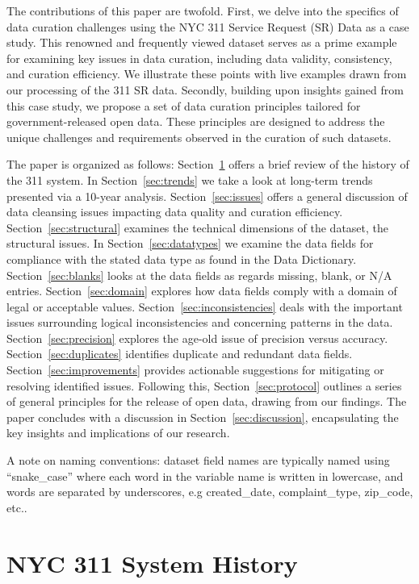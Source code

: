\documentclass[12pt, titlepage]{article}
\begin{document}
The contributions of this paper are twofold. First, we delve into
the specifics of data curation challenges using the NYC 311 Service
Request (SR) Data as a case study. This renowned and frequently viewed 
dataset serves as a prime example for examining key issues in data curation, 
including data validity, consistency, and curation efficiency. 
We illustrate these points with live examples drawn from our processing of the 311 SR data. 
Secondly, building upon insights gained from this case study, we 
propose a set of data curation principles tailored for government-released open data. 
These principles are designed to address the unique challenges 
and requirements observed in the curation of such datasets.


The paper is organized as follows:
Section~\ref{sec:history} offers a brief review of the history of the 311 system. In 
Section~\ref{sec:trends} we take a look at long-term trends presented via a 10-year analysis.
Section~\ref{sec:issues} offers a general discussion of data cleansing issues
impacting data quality and curation efficiency. Section~\ref{sec:structural} examines
the technical dimensions of the dataset, the structural issues. In Section~\ref{sec:datatypes} we examine the data fields
for compliance with the stated data type as found in the Data Dictionary. Section~\ref{sec:blanks} looks
at the data fields as regards missing, blank, or N/A entries. Section~\ref{sec:domain} explores
how data fields comply with a domain of legal or acceptable values. Section~\ref{sec:inconsistencies}
deals with the important issues surrounding logical inconsistencies and concerning patterns in the data. Section~\ref{sec:precision} 
explores the age-old issue of precision versus accuracy. Section~\ref{sec:duplicates}
identifies duplicate and redundant data fields. Section~\ref{sec:improvements} provides 
actionable suggestions for mitigating or resolving identified issues. Following this, Section~\ref{sec:protocol} outlines a series of general 
principles for the release of open data, drawing from our findings. The paper concludes with a discussion 
in Section~\ref{sec:discussion}, encapsulating the key insights and implications of our research.

A note on naming conventions: dataset field names are typically named using ``snake\_case'' where
each word in the variable name is written in lowercase, and words are separated by underscores,
e.g created\_date, complaint\_type, zip\_code, etc..   



\section{NYC 311 System History} \label{sec:history}
\end{document}
